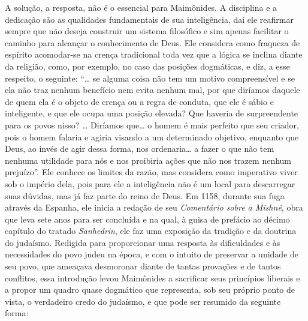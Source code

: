 A solução, a resposta, não é o essencial para Maimônides. A disciplina e
a dedicação são as qualidades fundamentais de sua inteligência, daí ele
reafirmar sempre que não deseja construir um sistema filosófico e sim
apenas facilitar o caminho para alcançar o conhecimento de Deus. Ele
considera como fraqueza de espírito acomodar-se na crença tradicional toda vez que a
lógica se inclina diante da religião, como, por exemplo, no caso das posições
dogmáticas, e diz, a esse respeito, o seguinte: ``\ldots{} se alguma coisa
não tem um motivo compreensível e se ela não traz nenhum benefício nem evita nenhum mal,
por que diríamos daquele de quem ela é o objeto de crença ou a regra de
conduta, que ele é sábio e inteligente, e que ele ocupa uma posição elevada? Que
haveria de surpreendente para os povos nisso? \ldots{} Diríamos que\ldots{} o homem é
mais perfeito que seu criador, pois o homem falaria e agiria visando a
um determinado objetivo, enquanto que Deus, ao invés de agir dessa forma, nos ordenaria\ldots{} a fazer o que não tem nenhuma utilidade para nós e nos proibiria ações
que não nos trazem nenhum prejuízo''. Ele conhece os limites da razão, mas
considera como imperativo viver sob o império dela, pois para ele a
inteligência não é um local para descarregar suas dúvidas, mas já faz parte do reino de
Deus. Em 1158, durante sua fuga através da Espanha, ele inicia a redação
de seu \emph{Comentário sobre a Mishné}, obra que leva sete anos para
ser concluída e na qual, à guisa de prefácio ao décimo capítulo do
tratado \emph{Sanhedrin}, ele faz uma exposição da tradição e da
doutrina do judaísmo. Redigida para proporcionar uma resposta às
dificuldades e às necessidades do povo judeu na época, e com o intuito
de preservar a unidade de seu povo, que ameaçava desmoronar diante de
tantas provações e de tantos conflitos, essa introdução levou Maimônides
a sacrificar seus princípios liberais e a propor um quadro quase
dogmático que representa, sob seu próprio ponto de vista, o verdadeiro
credo do judaísmo, e que pode ser resumido da seguinte forma:


